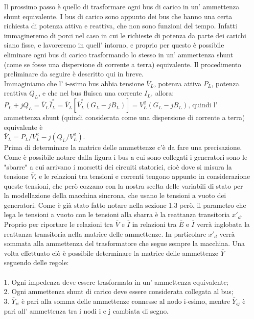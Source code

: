 \documentclass[Lau,noexaminfo]{sapthesis}
\begin{document}
	Il prossimo passo è quello di trasformare ogni bus di carico in un' ammettenza shunt equivalente. I bus di carico sono appunto dei bus che hanno una certa richiesta di potenza attiva e reattiva, che non sono funzioni del tempo. Infatti immagineremo di porci nel caso in cui le richieste di potenza da parte dei carichi siano fisse, e lavoreremo in quell' intorno, e proprio per questo è possibile eliminare ogni bus di carico trasformando lo stesso in un' ammettenza shunt (come se fosse una dispersione di corrente a terra) equivalente. Il procedimento preliminare da seguire è descritto qui in breve.\\
	Immaginiamo che l' i-esimo bus abbia tensione $\bar{V}_L$, potenza attiva $P_L$, potenza reattiva $Q_L$, e che nel bus fluisca una corrente $I_L$, allora:\\
	$P_L+jQ_L=\bar{V}_L\bar{I}^*_L=\bar{V}_L[\bar{V}^*_L(G_L-jB_L)]=V_L^2(G_L-jB_L)$, quindi l' ammettenza shunt (quindi considerata come una dispersione di corrente a terra) equivalente è\\
	$\bar{Y}_L=P_L/V^2_L-j(Q_L/V^2_L)$.\\
	Prima di determinare la matrice delle ammettenze c'è da fare una precisazione. Come è possibile notare dalla figura i bus a cui sono collegati i generatori sono le "sbarre" a cui arrivano i morsetti dei circuiti statorici, cioè dove si misura la tensione $\bar{V}$, e le relazioni tra tensioni e correnti tengono appunto in considerazione queste tensioni, che però cozzano con la nostra scelta delle variabili di stato per la modellazione della macchina sincrona, che usano le tensioni a vuoto dei generatori. Come è già stato fatto notare nella sezione 1.3 però, il parametro che lega le tensioni a vuoto con le tensioni alla sbarra è la reattanza transitoria $x'_d$. Proprio per riportare le relazioni tra $\bar{V}$ e $\bar{I}$ in relazioni tra $\bar{E}$ e $\bar{I}$ verrà inglobata la reattanza transitoria nella matrice delle ammettenze. In particolare $x'_d$ verrà sommata alla ammettenza del trasformatore che segue sempre la macchina.
	Una volta effettuato ciò è possibile determinare la matrice delle ammettenze $\bar{Y}$ seguendo delle regole:\\\\
	1. Ogni impedenza deve essere trasformata in un' ammettenza equivalente;\\
	2. Ogni ammettenza shunt di carico deve essere considerata collegata al bus;\\
	3. $\bar{Y}_{ii}$ è pari alla somma delle ammettenze connesse al nodo i-esimo, mentre $\bar{Y}_{ij}$ è pari all' ammettenza tra i nodi i e j cambiata di segno.\\\\
\end{document}
